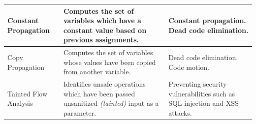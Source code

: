 \documentclass[bsc,twoside,singlespacing,parskip,logo,notimes,normalheadings]{infthesis}
\begin{document}
\begin{appendices}
\begin{tabular}{|l|p{5cm}|p{5cm}|}
    Constant Propagation                    & Computes the set of variables which have a constant value based on previous assignments.                   & Constant propagation. Dead code elimination.                                                    \\ \hline
    Copy Propagation                        & Computes the set of variables whose values have been copied from another variable.                         & Dead code elimination. Code motion.                                                             \\ \hline
    Tainted Flow Analysis\cite{TaintedFlow} & Identifies unsafe operations which have been passed unsanitized {\em (tainted)} input as a parameter.      & Preventing security vulnerabilities such as SQL injection and XSS attacks.                      \\ \hline
  \end{tabular}
\egroup


\end{appendices}
\end{document}
